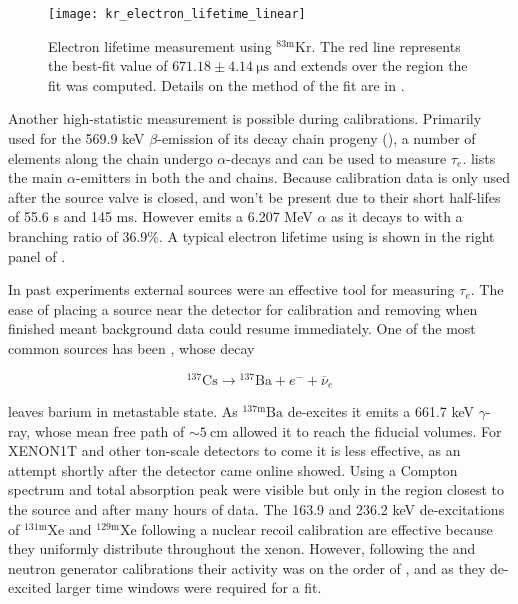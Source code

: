 \begin{figure}
\centering
\texttt{[image: kr\_electron\_lifetime\_linear]}
\caption{Electron lifetime measurement using $\mathrm{^{83m}Kr}$.  The red line represents the best-fit value of
$671.18 \pm 4.14\ \mathrm{\mu s}$ and extends over the region the fit was computed.  Details on the method of the fit are in
.}
\label{fig:det_char_elifetime_kr}
\end{figure}

Another high-statistic measurement is possible during  calibrations.  Primarily used for the 569.9 keV $\beta$-emission of
its decay chain progeny  (), a number of elements along the chain
undergo $\alpha$-decays and can be used to measure $\tau_e$.   lists the main $\alpha$-emitters in both the
 and  chains.  Because  calibration
data is only used after the source valve is closed,  and  won't be present due to their short half-lifes of
55.6 s and 145 ms.  However  emits a 6.207 MeV $\alpha$ as it decays to  with a
branching ratio of 36.9\%.  A typical electron lifetime using  is shown in the right panel of
.

In past experiments external \gammaray sources were an effective tool for measuring $\tau_e$.  The ease of placing a source near the
detector for calibration and removing when finished meant background data could resume immediately.  One of the most common sources has
been , whose decay

\begin{equation}
\mathrm{^{137}Cs} \rightarrow \mathrm{^{137}Ba} + e^- + \overline{\nu}_e
\end{equation}

\noindent leaves barium in metastable state.  As $\mathrm{^{137m}Ba}$ de-excites it emits a 661.7 keV $\gamma$-ray, whose mean
free path of ${\sim}5\ \mathrm{cm}$ allowed it to reach the fiducial volumes.  For
XENON1T and other ton-scale detectors to come it is less effective, as an attempt shortly after the detector came online showed.  Using
 a Compton spectrum and total absorption peak were visible but only in the region closest to the source and after many hours
of data.  The 163.9 and 236.2 keV de-excitations of $\mathrm{^{131m}Xe}$ and $\mathrm{^{129m}Xe}$ following a nuclear
recoil calibration are effective because they uniformly distribute throughout the xenon.  However, following the \ambe and neutron
generator calibrations their activity was on the order of , and as they de-excited larger time windows were required for
a fit.


